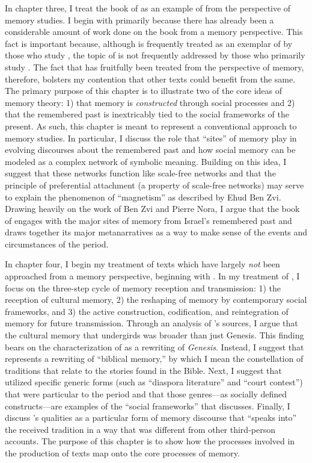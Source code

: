 In chapter three, I treat the book of \chronicles as an example of \rwb from the perspective of memory studies. I begin with \chronicles primarily because there has already been a considerable amount of work done on the book from a memory perspective. This fact is important because, although \chronicles is frequently treated as an exemplar of \rwb by those who study \rwb, the topic of \rwb is not frequently addressed by those who primarily study \chronicles. The fact that \chronicles has fruitfully been treated from the perspective of memory, therefore, bolsters my contention that other \rwb texts could benefit from the same. The primary purpose of this chapter is to illustrate two of the core ideas of memory theory: 1) that memory is \emph{constructed} through social processes and 2) that the remembered past is inextricably tied to the social frameworks of the present.  As such, this chapter is meant to represent a conventional approach to memory studies. In particular, I discuss the role that ``sites'' of memory play in evolving discourses about the remembered past and how social memory can be modeled as a complex network of symbolic meaning. Building on this idea, I suggest that these networks function like scale-free networks and that the principle of preferential attachment (a property of scale-free networks) may serve to explain the phenomenon of ``magnetism'' as described by Ehud Ben Zvi. Drawing heavily on the work of Ben Zvi and Pierre Nora, I argue that the book of \chronicles engages with the major sites of memory from Israel's remembered past and draws together its major metanarratives as a way to make sense of the events and circumstances of the \secondtemple period.

In chapter four, I begin my treatment of \rwb texts which have largely \emph{not} been approached from a memory perspective, beginning with \ga. In my treatment of \ga, I focus on the three-step cycle of memory reception and transmission: 1) the reception of cultural memory, 2) the reshaping of memory by contemporary social frameworks, and 3) the active construction, codification, and reintegration of memory for future transmission. Through an analysis of \ga's sources, I argue that the cultural memory that undergirds \ga was broader than just Genesis. This finding bears on the characterization of \ga as a rewriting of \emph{Genesis}. Instead, I suggest that \ga represents a rewriting of ``biblical memory,'' by which I mean the constellation of traditions that relate to the stories found in the Bible. Next, I suggest that \ga utilized specific generic forms (such as ``diaspora literature'' and ``court contest'') that were particular to the \secondtemple period and that those genres---as socially defined constructs---are examples of the ``social frameworks'' that \halbwachs discusses. Finally, I discuss \ga's \psgraphical qualities as a particular form of memory discourse that ``speaks into'' the received tradition in a way that was different from other third-person accounts. The purpose of this chapter is to show how the processes involved in the production of \rwb texts map onto the core processes of memory.

